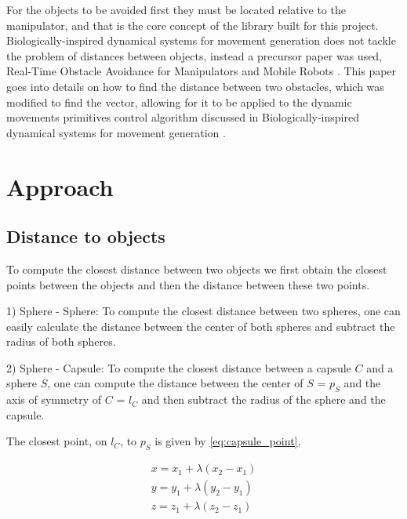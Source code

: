 \documentclass[a4paper, 10pt, conference]{ieeeconf}      %
\begin{document}

For the objects to be avoided first they must be located relative to the manipulator, and that is the core concept of the library built for this project. Biologically-inspired dynamical systems for movement generation \cite{Hoffmann} does not tackle the problem of distances between objects, instead a precursor paper was used, Real-Time Obstacle Avoidance for Manipulators and Mobile Robots \cite{Khatib}. This paper goes into details on how to find the distance between two obstacles, which was modified to find the vector, allowing for it to be applied to the dynamic movements primitives control algorithm discussed in Biologically-inspired dynamical systems for movement generation \cite{Hoffmann}.


\section{Approach}

\subsection{Distance to objects} %
To compute the closest distance between two objects we first obtain the closest points between the objects and then the distance between these two points.

1) Sphere - Sphere: 
To compute the closest distance between two spheres, one can easily calculate the distance between the center of both spheres and subtract the radius of both spheres.

2) Sphere - Capsule:
To compute the closest distance between a capsule $C$ and a sphere $S$, one can compute the distance between the center of $S$ = $p_S$ and the axis of symmetry of $C$ = $l_C$
and then subtract the radius of the sphere and the capsule. 

The closest point, on $l_C$, to $p_S$ is given by \eqref{eq:capsule_point},

\begin{equation}       
    \begin{matrix} 
        x = x_1 + \lambda(x_2 - x_1) \\
        y = y_1 + \lambda(y_2 - y_1) \\
        z = z_1 + \lambda(z_2 - z_1) \label{eq:capsule_point}
    \end{matrix}
\end{equation}
\end{document}
